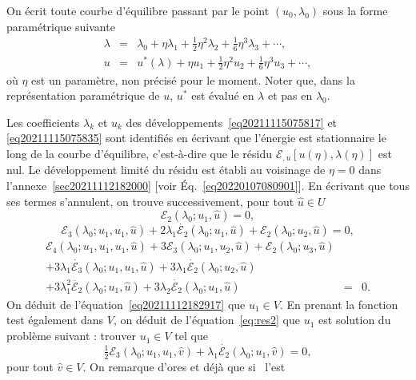 \documentclass{article}
\begin{document}
On écrit toute courbe d'équilibre passant par le point $(u_0,
λ_0)$ sous la forme paramétrique suivante
\begin{eqnarray}
  λ & = & λ_0 + η λ_1 + \tfrac{1}{2} η^2 λ_2 +
  \tfrac{1}{6} η^3 λ_3 + \cdots,  \label{eq20211115075817}\\
  u & = & u^{\ast} (λ) + η u_1 + \tfrac{1}{2} η^2 u_2 +
  \tfrac{1}{6} η^3 u_3 + \cdots,  \label{eq20211115075835}
\end{eqnarray}
où $η$ est un paramètre, non précisé pour le moment. Noter
que, dans la représentation paramétrique de $u$, $u^{\ast}$ est
évalué en $λ$ et pas en $λ_0$.

Les coefficients $λ_k$ et $u_k$ des
développements~\eqref{eq20211115075817} et \eqref{eq20211115075835} sont
identifiés en écrivant que l'énergie est stationnaire le long de
la courbe d'équilibre, c'est-à-dire que le résidu $ℰ_{,
u}  [u (η), λ (η)]$ est nul. Le développement limité du
résidu est établi au voisinage de $η = 0$ dans
l'annexe~\ref{sec20211112182000} [voir Éq.~\eqref{eq20220107080901}]. En
écrivant que tous ses termes s'annulent, on trouve successivement, pour
tout $\hat{u}∈U$
\begin{equation}
  \label{eq20211112182917} ℰ_2 (λ_0 ; u_1, \hat{u}) = 0,
\end{equation}
\begin{equation}
  \label{eq:res2} ℰ_3 (λ_0 ; u_1, u_1, \hat{u}) + 2 λ_1
  \dot{ℰ_2} (λ_0 ; u_1, \hat{u}) +ℰ_2 (λ_0 ;
  u_2, \hat{u}) = 0,
\end{equation}
\begin{eqnarray}
  ℰ_4 (λ_0 ; u_1, u_1, u_1, \hat{u}) + 3ℰ_3
  (λ_0 ; u_1, u_2, \hat{u}) +ℰ_2 (λ_0 ; u_3, \hat{u}) &
  &  \nonumber\\
  + 3 λ_1  \dot{ℰ_3} (λ_0 ; u_1, u_1, \hat{u}) + 3
  λ_1  \dot{ℰ_2} (λ_0 ; u_2, \hat{u}) &  &  \nonumber\\
  + 3 λ_1^2  \ddot{ℰ_2} (λ_0 ; u_1, \hat{u}) + 3
  λ_2  \dot{ℰ_2} (λ_0 ; u_1, \hat{u}) & = & 0.
  \label{eq:res3}
\end{eqnarray}
On déduit de l'équation~\eqref{eq20211112182917} que $u_1∈V$. En
prenant la fonction test également dans $V$, on déduit de
l'équation~\eqref{eq:res2} que $u_1$ est solution du problème suivant
: trouver $u_1∈V$ tel que
\begin{equation}
  \label{eq:bifurcation 1a} \tfrac{1}{2} ℰ_3 (λ_0 ; u_1, u_1,
  \hat{v}) + λ_1  \dot{ℰ_2} (λ_0 ; u_1, \hat{v}) = 0,
\end{equation}
pour tout $\hat{v}∈V$. On remarque d'ores et déjà que si \ l'est
\end{document}
